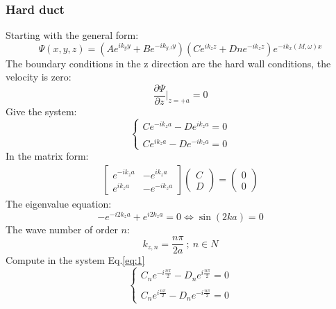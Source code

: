 \subsubsection*{Hard duct}\label{sec:EigenvalueHard}
Starting with the general form:
\begin{equation}
        \Psi(x,y,z)=(Ae^{ik_{y}y}+Be^{-ik_{y,l}y})(Ce^{ik_{z}z}+Dne^{-ik_{z}z})e^{-ik_{x}(M,\omega)x}
\end{equation}
The boundary conditions in the z direction are the hard wall conditions, the velocity is zero:  
\begin{equation}
    \frac{\partial\Psi}{\partial z} \Bigg|_{z=+a}=0
\end{equation}
Give the system:
\begin{equation}\label{eq:1}
    \left\{
    \begin{array}{ll}
    Ce^{-ik_za}-De^{ik_za}=0\\
        \\
    Ce^{ik_za}-De^{-ik_za}=0   
    \end{array}
    \right.
\end{equation}
In the matrix form: 
\begin{gather}
    \begin{bmatrix}
      e^{-ik_za} & -e^{ik_za} \\
      e^{ik_za} & -e^{-ik_za}
    \end{bmatrix}
    \begin{pmatrix}
       C\\
       D
    \end{pmatrix}
    =
    \begin{pmatrix}
      0\\
      0
    \end{pmatrix}
\end{gather}
The eigenvalue equation:
\begin{equation}
    -e^{-i2k_za}+e^{i2k_za}=0 \iff \sin(2ka)=0
\end{equation}
The wave number of order $n$:
\begin{equation}
    k_{z,n}=\frac{n\pi}{2a} \ ; \ n\in N
\end{equation}
Compute in the system Eq.\eqref{eq:1}
\begin{equation}
    \left\{
    \begin{array}{ll}
    C_ne^{-i\frac{n\pi}{2}}-D_ne^{i\frac{n\pi}{2}}=0\\
        \\
    C_ne^{i\frac{n\pi}{2}}-D_ne^{-i\frac{n\pi}{2}}=0   
    \end{array}
    \right.
\end{equation}
